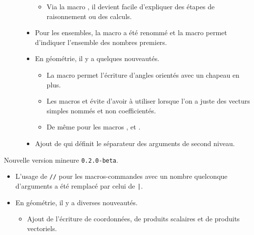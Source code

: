 \documentclass[12pt,a4paper]{book}
\begin{document}
\begin{description}
\begin{itemize}[itemsep=.5em]
\begin{itemize}[itemsep=.5em]
        \item Via la macro , il devient facile d'expliquer des étapes de raisonnement ou des calculs.
    \end{itemize}




    \item Pour les ensembles, la macro  a été renommé  et la macro  permet d'indiquer l'ensemble des nombres premiers.




    \item En géométrie, il y a quelques nouveautés.
    \begin{itemize}[itemsep=.5em]
        \item La macro  permet l'écriture d'angles orientés avec un chapeau en plus.

        \item Les macros  et  évite d'avoir à utiliser  lorsque l'on a juste des vecturs simples nommés et non coefficientés.

        \item De même pour les macros ,  et .
    \end{itemize}




    \item Ajout de  qui définit le séparateur des arguments de second niveau.
\end{itemize}

\end{description}\begin{description}
\medskip
\item[2019-02-21] Nouvelle version mineure \verb+0.2.0-beta+.

\begin{itemize}[itemsep=.5em]
    \item L'usage de \verb+//+ pour les macros-commandes avec un nombre quelconque d'arguments a été remplacé par celui de \verb+|+.




    \item En géométrie, il y a diverses nouveautés.
    \begin{itemize}[itemsep=.5em]
        \item Ajout de l'écriture de coordonnées, de produits scalaires et de produits vectoriels.


\end{itemize}
\end{itemize}
\end{description}
\end{document}
